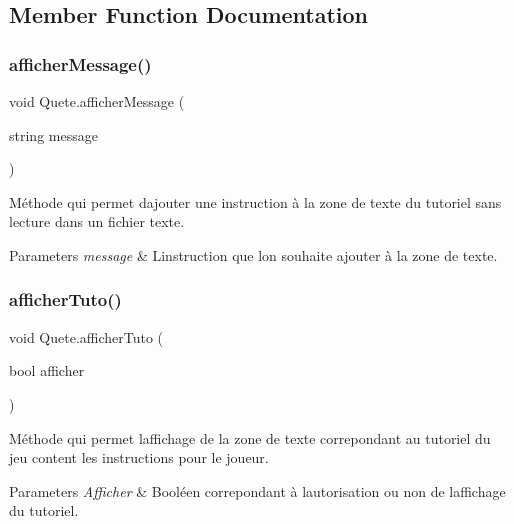 \subsection{Member Function Documentation}
\mbox{\label{class_quete_aaa6d56872c638d4d638f177aa007f806}} 
\subsubsection{\texorpdfstring{afficher\+Message()}{afficherMessage()}}
{\footnotesize\ttfamily void Quete.\+afficher\+Message (\begin{DoxyParamCaption}\item[{string}]{message }\end{DoxyParamCaption})\hspace{0.3cm}{\ttfamily [inline]}}

Méthode qui permet d\textquotesingle{}ajouter une instruction à la zone de texte du tutoriel sans lecture dans un fichier texte. 
\begin{DoxyParams}{Parameters}
{\em message} & L\textquotesingle{}instruction que l\textquotesingle{}on souhaite ajouter à la zone de texte. \\
\hline
\end{DoxyParams}
\mbox{\label{class_quete_a41ce4f53ca28d9ae01c582ea97086dc7}} 
\subsubsection{\texorpdfstring{afficher\+Tuto()}{afficherTuto()}}
{\footnotesize\ttfamily void Quete.\+afficher\+Tuto (\begin{DoxyParamCaption}\item[{bool}]{afficher }\end{DoxyParamCaption})\hspace{0.3cm}{\ttfamily [inline]}}

Méthode qui permet l\textquotesingle{}affichage de la zone de texte correpondant au tutoriel du jeu content les instructions pour le joueur. 
\begin{DoxyParams}{Parameters}
{\em Afficher} & Booléen correpondant à l\textquotesingle{}autorisation ou non de l\textquotesingle{}affichage du tutoriel. \\
\hline
\end{DoxyParams}
\mbox{\label{class_quete_ab2c08c75954a9f4627cb7d298e55a92f}} 
